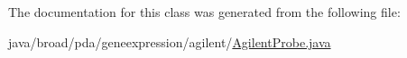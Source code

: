 The documentation for this class was generated from the following file\+:\begin{DoxyCompactItemize}
\item 
java/broad/pda/geneexpression/agilent/\hyperlink{_agilent_probe_8java}{Agilent\+Probe.\+java}\end{DoxyCompactItemize}

